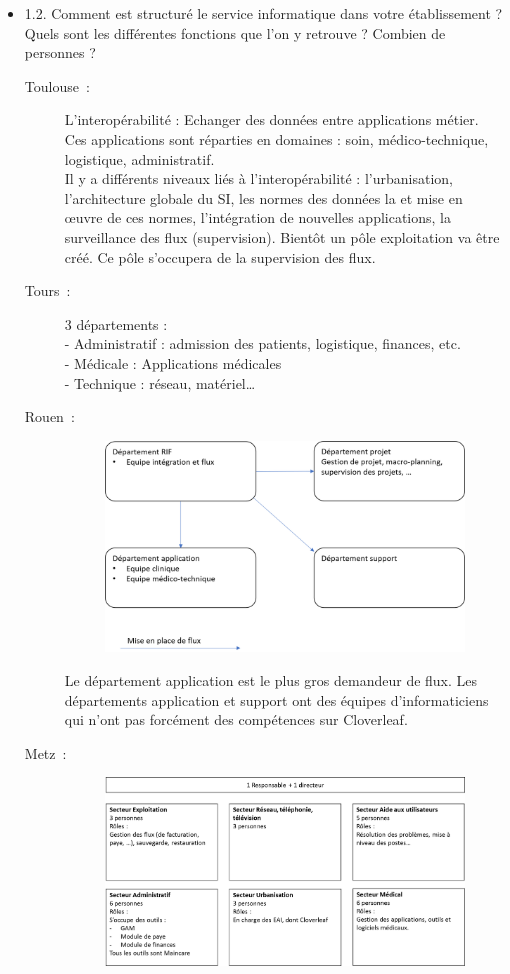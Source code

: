 \begin{itemize}
	  \item 1.2. Comment est structuré le service informatique dans votre
	  établissement ? Quels sont les différentes fonctions que l’on y retrouve ? Combien de personnes ?
	  \begin{description}
	  	\item[Toulouse~:] L’interopérabilité : Echanger des données entre
	  	applications métier. Ces applications sont réparties en domaines : soin,
	  	médico-technique, logistique, administratif.\\
		Il y a différents niveaux liés à l’interopérabilité : l’urbanisation,
		l'architecture globale du SI, les normes des données la et mise en œuvre de
		ces normes, l'intégration de nouvelles applications, la surveillance des flux
		(supervision). Bientôt un pôle exploitation va être créé. Ce pôle s’occupera
		de la supervision des flux.
	  	\item[Tours~:] 3 départements : \\
		-	Administratif : admission des patients, logistique, finances, etc.\\
		-	Médicale : Applications médicales\\
		-	Technique : réseau, matériel…
	  	\item[Rouen~:]
	  	\begin{figure}[H]
			\centering
			\includegraphics[width=15cm]{../img/annexes/orga_rouen.png}
		\end{figure}
		Le département application est le plus gros demandeur de flux. Les
		départements application et support ont des équipes d’informaticiens qui
		n’ont pas forcément des compétences sur Cloverleaf.
	  	\item[Metz~:]
	  	\begin{figure}[H]
			\centering
			\includegraphics[width=15cm]{../img/annexes/orga_metz.png}

\end{figure}
\end{description}
\end{itemize}
